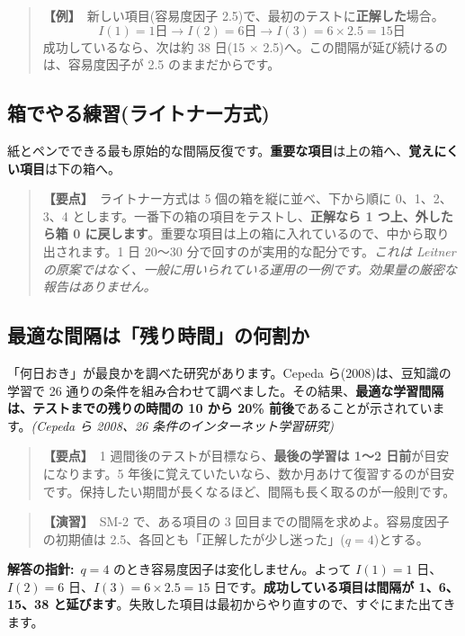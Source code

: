 \documentclass{article}
\begin{document}
\begin{quote}
\textbf{【例】}\ 新しい項目(容易度因子 2.5)で、最初のテストに\textbf{正解した}場合。
\[ I(1) = 1\text{日} \to I(2) = 6\text{日} \to I(3) = 6 \times 2.5 = 15\text{日} \]
成功しているなら、次は約 38 日(15 \(\times\) 2.5)へ。この間隔が延び続けるのは、容易度因子が 2.5 のままだからです。
\end{quote}

\subsection{箱でやる練習(ライトナー方式)}

紙とペンでできる最も原始的な間隔反復です。\textbf{重要な項目}は上の箱へ、\textbf{覚えにくい項目}は下の箱へ。

\begin{quote}
\textbf{【要点】}\ ライトナー方式は 5 個の箱を縦に並べ、下から順に 0、1、2、3、4 とします。一番下の箱の項目をテストし、\textbf{正解なら 1 つ上、外したら箱 0 に戻します}。重要な項目は上の箱に入れているので、中から取り出されます。1 日 20〜30 分で回すのが実用的な配分です。\emph{これは Leitner の原案ではなく、一般に用いられている運用の一例です。効果量の厳密な報告はありません。}
\end{quote}

\subsection{最適な間隔は「残り時間」の何割か}

「何日おき」が最良かを調べた研究があります。Cepeda ら(2008)は、豆知識の学習で 26 通りの条件を組み合わせて調べました。その結果、\textbf{最適な学習間隔は、テストまでの残りの時間の 10 から 20\% 前後}であることが示されています。\emph{(Cepeda ら 2008、26 条件のインターネット学習研究)}

\begin{quote}
\textbf{【要点】}\ 1 週間後のテストが目標なら、\textbf{最後の学習は 1〜2 日前}が目安になります。5 年後に覚えていたいなら、数か月あけて復習するのが目安です。保持したい期間が長くなるほど、間隔も長く取るのが一般則です。
\end{quote}

\begin{quote}
\textbf{【演習】}\ SM-2 で、ある項目の 3 回目までの間隔を求めよ。容易度因子の初期値は 2.5、各回とも「正解したが少し迷った」(\(q = 4\))とする。
\end{quote}

\textbf{解答の指針:}\ \(q = 4\) のとき容易度因子は変化しません。よって \(I(1) = 1\) 日、\(I(2) = 6\) 日、\(I(3) = 6 \times 2.5 = 15\) 日です。\textbf{成功している項目は間隔が 1、6、15、38 と延びます}。失敗した項目は最初からやり直すので、すぐにまた出てきます。
\end{document}
